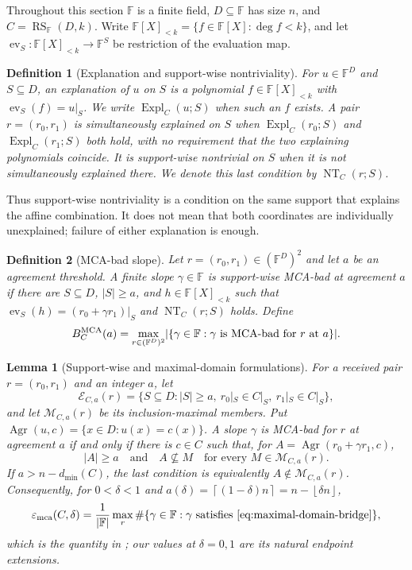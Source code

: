 \documentclass[11pt,a4paper]{amsart}
\numberwithin{equation}{section}
\newtheorem{lemma}[lemma]{Lemma}
\newtheorem{definition}[definition]{Definition}
\theoremstyle{remark}
\DeclareMathOperator{\RS}{RS}
\newcommand{\F}{\mathbb F}
\newcommand{\abs}[1]{\lvert #1\rvert}
\newcommand{\floor}[1]{\left\lfloor #1\right\rfloor}
\newcommand{\ceil}[1]{\left\lceil #1\right\rceil}
\begin{document}
Throughout this section \(\F\) is a finite field, \(D\subseteq\F\) has
size \(n\), and \(C=\RS_\F(D,k)\).  Write
\(\F[X]_{<k}=\{f\in\F[X]:\deg f<k\}\), and let
\(\operatorname{ev}_S:\F[X]_{<k}\to\F^S\) be restriction of the
evaluation map.

\begin{definition}[Explanation and support-wise nontriviality]
\label{def:explanation}
For \(u\in\F^D\) and \(S\subseteq D\), an \emph{explanation of \(u\) on
\(S\)} is a polynomial \(f\in\F[X]_{<k}\) with
\(\operatorname{ev}_S(f)=u|_S\).  We write
\(\operatorname{Expl}_C(u;S)\) when such an \(f\) exists.  A pair
\(r=(r_0,r_1)\) is \emph{simultaneously explained on \(S\)} when
\(\operatorname{Expl}_C(r_0;S)\) and
\(\operatorname{Expl}_C(r_1;S)\) both hold, with no requirement that the
two explaining polynomials coincide.  It is \emph{support-wise
nontrivial on \(S\)} when it is not simultaneously explained there.
We denote this last condition by \(\operatorname{NT}_C(r;S)\).
\end{definition}

Thus support-wise nontriviality is a condition on the same support that
explains the affine combination.  It does not mean that both coordinates
are individually unexplained; failure of either explanation is enough.

\begin{definition}[MCA-bad slope]\label{def:mca-bad}
Let \(r=(r_0,r_1)\in(\F^D)^2\) and let \(a\) be an agreement threshold.
A finite slope \(\gamma\in\F\) is support-wise MCA-bad at agreement \(a\)
if there are \(S\subseteq D\), \(\abs S\ge a\), and
\(h\in\F[X]_{<k}\) such that
\(\operatorname{ev}_S(h)=(r_0+\gamma r_1)|_S\) and
\(\operatorname{NT}_C(r;S)\) holds.  Define
\[
        B_C^{\rm MCA}(a)
        =\max_{r\in(\F^D)^2}\abs{\{\gamma\in\F:
          \gamma\text{ is MCA-bad for }r\text{ at }a\}}.
\]
\end{definition}

\begin{lemma}[Support-wise and maximal-domain formulations]
\label{lem:mca-definition-bridge}
For a received pair \(r=(r_0,r_1)\) and an integer \(a\), let
\[
 \mathcal E_{C,a}(r)=\{S\subseteq D:\abs S\ge a,
     \ r_0|_S\in C|_S,\ r_1|_S\in C|_S\},
\]
and let \(\mathcal M_{C,a}(r)\) be its inclusion-maximal members.  Put
\(\operatorname{Agr}(u,c)=\{x\in D:u(x)=c(x)\}\).  A slope \(\gamma\)
is MCA-bad for \(r\) at agreement \(a\) if and only if there is \(c\in C\)
such that, for \(A=\operatorname{Agr}(r_0+\gamma r_1,c)\),
\[
 \abs A\ge a\quad\text{and}\quad
 A\nsubseteq M\quad\text{for every }M\in\mathcal M_{C,a}(r). \tag{MDB}
 \label{eq:maximal-domain-bridge}
\]
If \(a>n-d_{\min}(C)\), the last condition is equivalently
\(A\notin\mathcal M_{C,a}(r)\).  Consequently, for \(0<\delta<1\) and
\(a(\delta)=\ceil{(1-\delta)n}=n-\floor{\delta n}\),
\[
 \varepsilon_{\rm mca}(C,\delta)=\frac1{\abs\F}
 \max_r\#\{\gamma\in\F:\gamma\text{ satisfies \eqref{eq:maximal-domain-bridge}}\},
\]
which is the quantity in \cite[Definition~4.3]{ABF26}; our values at
\(\delta=0,1\) are its natural endpoint extensions.
\end{lemma}
\end{document}
